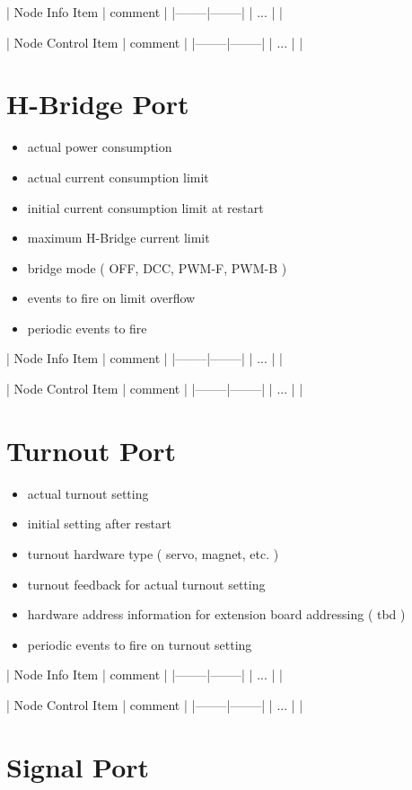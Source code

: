 | Node Info Item | comment |
|--------|--------|
| ... | |

| Node Control Item | comment |
|--------|--------|
| ... | |

\section{H-Bridge Port}

\begin{itemize}
\item actual power consumption
\item actual current consumption limit
\item initial current consumption limit at restart
\item maximum H-Bridge current limit
\item bridge mode ( OFF, DCC, PWM-F, PWM-B )
\item events to fire on limit overflow
\item periodic events to fire
\end{itemize}

| Node Info Item | comment |
|--------|--------|
| ... | |

| Node Control Item | comment |
|--------|--------|
| ... | |


\section{Turnout Port}

\begin{itemize}
\item actual turnout setting
\item initial setting after restart
\item turnout hardware type ( servo, magnet, etc. )
\item turnout feedback for actual turnout setting
\item hardware address information for extension board addressing ( tbd )
\item periodic events to fire on turnout setting
\end{itemize}

| Node Info Item | comment |
|--------|--------|
| ... | |

| Node Control Item | comment |
|--------|--------|
| ... | |

\section{Signal Port}

